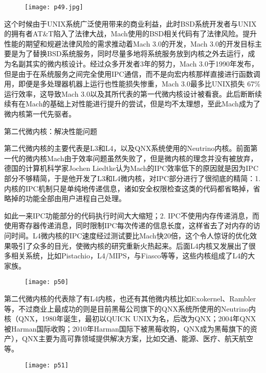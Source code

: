\documentclass[utf8]{book}
\begin{document}
	\begin{figure}[H]
	\centering
	\texttt{[image: p49.jpg]}
	\end{figure}

这个时候由于UNIX系统广泛使用带来的商业利益，此时BSD系统开发者与UNIX的拥有者AT\&T陷入了法律大战，Mach使用的BSD相关代码有了法律风险。提升性能的期望和规避法律风险的需求推动着Mach 3.0的开发，Mach 3.0的开发目标主要是为了替换BSD系统服务，同时尽量多地将系统服务放到内核之外去运行，成为名副其实的微内核设计。经过众多开发者3年的努力，Mach 3.0于1990年发布，但是由于在系统服务之间完全使用IPC通信，而不是向宏内核那样直接进行函数调用，即便是多处理器机器上运行也性能损失惨重，Mach 3.0最多比UNIX损失 67\% 运行效率，这导致Mach 3.0以及其所代表的第一代微内核设计被看衰。此后断断续续有在Mach的基础上对性能进行提升的尝试，但是均不太理想，至此Mach成为了微内核第一代先驱者。

{\large 第二代微内核：解决性能问题}

第二代微内核的主要代表是L3和L4，以及QNX系统使用的Neutrino内核。前面第一代的微内核Mach由于效率问题虽然失败了，但是微内核的理念并没有被放弃，德国的计算机科学家Jochen Liedtke认为Mach的IPC效率低下的原因就是因为IPC部分不够精简，于是他开发了L3和L4微内核，对IPC部分进行了很彻底的精简：1. 内核的IPC机制只是单纯地传递信息，诸如安全权限检查这类的代码都省略掉，省略掉的功能全部由用户进程自己处理。

如此一来IPC功能部分的代码执行时间大大缩短；2. IPC不使用内存传递消息，而使用寄存器传递消息，同时限制IPC每次传递的信息长度，这样省去了对内存的访问时间。L4微内核的IPC速度经过测试要比Mach快20倍，这个令人惊讶的优化效果吸引了众多的目光，使微内核的研究重新火热起来。后面L4内核又发展出了很多相关系统，比如Pistachio，L4/MIPS，与Fiasco等等，这些内核组成了L4的大家族。

	\begin{figure}[H]
	\centering
	\texttt{[image: p50]}
	\end{figure}

第二代微内核的代表除了有L4内核，也还有其他微内核比如Exokernel、Rambler等，不过商业上最成功的则是目前黑莓公司旗下的QNX系统所使用的Neutrino内核（QNX，1980年诞生，最初以QUICK UNIX为名，后改为QNX；2004年QNX被Harman国际收购；2010年Harman国际下被黑莓收购，QNX成为黑莓旗下的资产），QNX主要为高可靠领域提供解决方案，比如交通、能源、医疗、航天航空等。
	\begin{figure}[H]
	\centering
	\texttt{[image: p51]}
	\end{figure}
\end{document}
